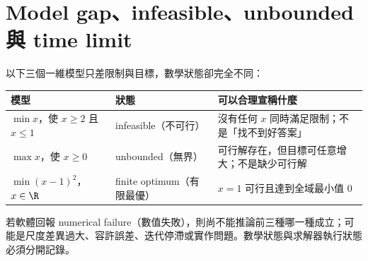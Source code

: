 \documentclass[11pt,a4paper,oneside,openany]{book}
\begin{document}
\section{Model gap、infeasible、unbounded 與 time limit}
\begin{example}
以下三個一維模型只差限制與目標，數學狀態卻完全不同：
\begin{center}
\begin{tabularx}{.92\textwidth}{@{}lYY@{}}
\toprule
模型 & 狀態 & 可以合理宣稱什麼 \\
\midrule
$\min x$，使 $x\ge2$ 且 $x\le1$
  & infeasible（不可行）
  & 沒有任何 $x$ 同時滿足限制；不是「找不到好答案」\\
$\max x$，使 $x\ge0$
  & unbounded（無界）
  & 可行解存在，但目標可任意增大；不是缺少可行解\\
$\min (x-1)^2$，$x\in\R$
  & finite optimum（有限最優）
  & $x=1$ 可行且達到全域最小值 0\\
\bottomrule
\end{tabularx}
\end{center}
若軟體回報 numerical failure（數值失敗），則尚不能推論前三種哪一種成立；可能是尺度差異過大、容許誤差、迭代停滯或實作問題。數學狀態與求解器執行狀態必須分開記錄。
\end{example}
\end{document}
